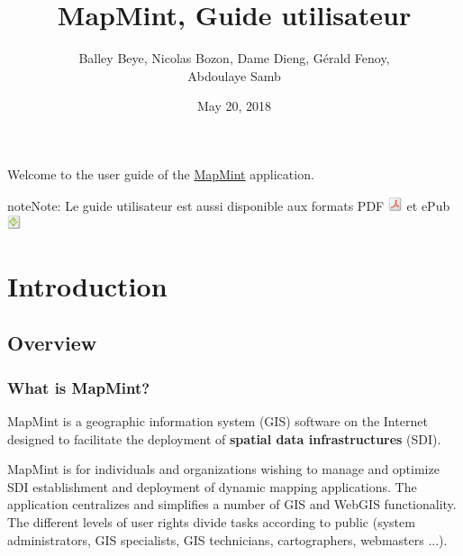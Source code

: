 \documentclass[letterpaper,10pt,english]{sphinxmanual}
\title{MapMint, Guide utilisateur}
\date{May 20, 2018}
\author{Balley Beye, Nicolas Bozon, Dame Dieng, Gérald Fenoy, \\Abdoulaye Samb}
\begin{document}
\maketitle
\tableofcontents
{}\label{index::doc}


Welcome to the user guide of the \href{http://mapmint.com}{MapMint} application.

\begin{notice}{note}{Note:}
Le guide utilisateur est aussi disponible aux formats
PDF \includegraphics{pdf.png}  et ePub \includegraphics{epub.png}
\end{notice}


\chapter{Introduction}
\label{introduction/index:table-des-matieres}\label{introduction/index:home}\label{introduction/index::doc}\label{introduction/index:dashboard}\label{introduction/index:introduction}

\section{Overview}
\label{introduction/introduction:generalites}\label{introduction/introduction::doc}\label{introduction/introduction:userguidegeneral}

\subsection{What is MapMint?}
\label{introduction/introduction:quest-ce-que-mapmint}
MapMint is a geographic information system (GIS) software on the Internet designed to facilitate the deployment of  \textbf{spatial data infrastructures} (SDI).

MapMint is for individuals and organizations wishing to manage and optimize SDI establishment and deployment of dynamic mapping applications. The application centralizes and simplifies a number of GIS and WebGIS functionality. The different levels of user rights divide tasks according to public (system administrators, GIS specialists, GIS technicians, cartographers, webmasters ...).
\end{document}
